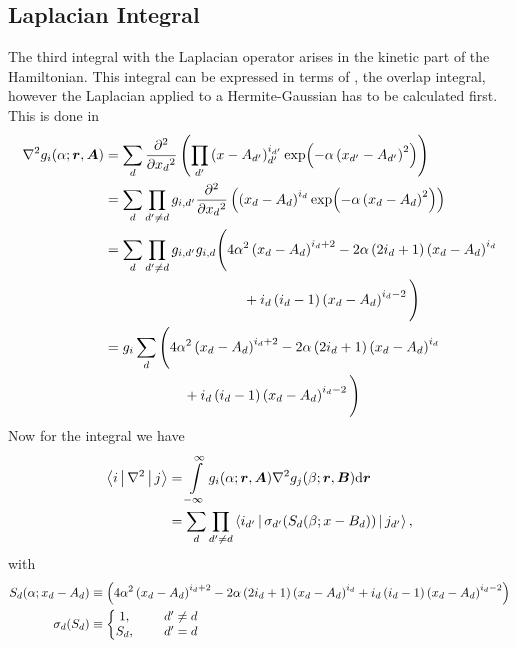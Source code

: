 \subsection{Laplacian Integral}
    The third integral with the Laplacian operator arises in the kinetic part
    of the Hamiltonian. This integral can be expressed in terms of
    , the overlap integral, however the Laplacian applied
    to a Hermite-Gaussian has to be calculated first. This is done in
        \begin{align}
            \nabla^2 g_i(\alpha;\blds{r},\blds{A}) &= \sum_d \prd{x_d}[][2]
            \left(\prod_{d'} \left(x - A_{d'}\right)^{i_{d'}}_{d'} \exp(-\alpha
            \left(x_{d'} - A_{d'}\right)^2)\right)\nonumber \\
            &= \sum_d \prod_{d'\neq d} g_{i,d'} \prd{x_d}[][2]\left(\left(x_d -
            A_d\right)^{i_d} \exp(-\alpha \left(x_d - A_d\right)^2)\right)
            \nonumber \\
            &= \sum_d \prod_{d'\neq d} g_{i,d'} g_{i,d}
            \Bigg(4\alpha^2\left(x_d-A_d\right)^{i_d+2} -
            2\alpha\left(2i_d+1\right)\left(x_d-A_d\right)^{i_d} \nonumber \\ 
            &\hspace{3.5cm}+
            i_d\left(i_d-1\right)\left(x_d-A_d\right)^{i_d-2}\Bigg) \nonumber
            \\
            &= g_i\sum_d \Bigg(4\alpha^2\left(x_d-A_d\right)^{i_d+2} -
            2\alpha\left(2i_d+1\right)\left(x_d-A_d\right)^{i_d} \nonumber \\
            &\hspace{2.0cm}+
            i_d\left(i_d-1\right)\left(x_d-A_d\right)^{i_d-2}\Bigg)
            \label{eq:laphermcalc}
        \end{align}
    Now for the integral we have
        \begin{align}
            \Braket{i|\nabla^2|j} &= \int\limits^{\infty}_{-\infty}
            g_i(\alpha;\boldsymbol{{r}},\boldsymbol{{A}})\nabla^2g_j(\beta;\boldsymbol{{r}},\boldsymbol{{B}}) 
            \mathrm{d}\boldsymbol{{r}} \nonumber \\
            &= \sum_d\prod_{d'\neq d}
            \Braket{i_{d'}|\sigma_{d'}(S_d(\beta;x-B_d))|j_{d'}},
            \label{eq:laplacianIntegral}
        \end{align}
    with
        \begin{equation}
            \begin{aligned}
                S_d(\alpha;x_d-A_d) &\equiv
                \left(4\alpha^2\left(x_d-A_d\right)^{i_d+2} -
                2\alpha\left(2i_d+1\right)\left(x_d-A_d\right)^{i_d} +
                i_d\left(i_d-1\right)\left(x_d-A_d\right)^{i_d-2}\right) \\
                \sigma_d(S_d) &\equiv \left\{\begin{matrix}
                                            1,&\indent d' \neq d \\
                                            S_d,&\indent d' = d
                                            \end{matrix}
                                        \right.
            \end{aligned}
        \end{equation}
